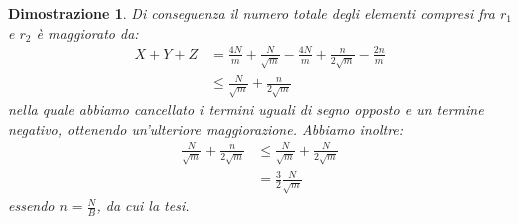 \documentclass[a4paper, 11pt]{article}
\theoremstyle{plain}
\newtheorem*{proof*}{Dimostrazione}
\begin{document}
\begin{proof*}
        Di conseguenza il numero totale degli elementi compresi fra \(r_1\) 
        e \(r_2\) è maggiorato da:
        \begin{align}
            X + Y + Z &= \frac{4N}{m} + \frac{N}{\sqrt{m}} - \frac{4N}{m} + \frac{n}{2\sqrt{m}} - \frac{2n}{m} \nonumber \\
            &\le \frac{N}{\sqrt{m}} + \frac{n}{2\sqrt{m}} \nonumber
        \end{align}
        nella quale abbiamo cancellato i termini uguali di segno opposto e un
        termine negativo, ottenendo un'ulteriore maggiorazione. Abbiamo
        inoltre:
        \begin{align}
            \frac{N}{\sqrt{m}} + \frac{n}{2\sqrt{m}} &\le \frac{N}{\sqrt{m}} + \frac{N}{2\sqrt{m}} \nonumber \\
            &= \frac{3}{2}\frac{N}{\sqrt{m}} \nonumber
        \end{align}
        essendo \(n = \frac{N}{B}\), da cui la tesi.
    \end{proof*}
\end{document}

